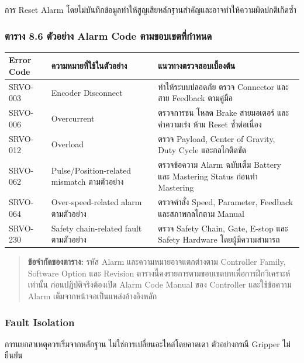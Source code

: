 การ Reset Alarm โดยไม่บันทึกข้อมูลทำให้สูญเสียหลักฐานสำคัญและอาจทำให้ความผิดปกติเกิดซ้ำ

\subsubsection{ตาราง 8.6 ตัวอย่าง Alarm Code ตามขอบเขตที่กำหนด}

\begin{table}[htbp]
    \centering
    \small
    \begin{tabularx}{\textwidth}{@{}L{0.16\textwidth}L{0.28\textwidth}Y@{}}
        \hline
        \textbf{Error Code} & \textbf{ความหมายที่ใช้ในตัวอย่าง} & \textbf{แนวทางตรวจสอบเบื้องต้น} \\
        \hline
        SRVO-003 & Encoder Disconnect & ทำให้ระบบปลอดภัย ตรวจ Connector และสาย Feedback ตามคู่มือ \\
        SRVO-006 & Overcurrent & ตรวจการชน โหลด Brake สายมอเตอร์ และค่าความเร่ง ห้าม Reset ซ้ำต่อเนื่อง \\
        SRVO-012 & Overload & ตรวจ Payload, Center of Gravity, Duty Cycle และกลไกติดขัด \\
        SRVO-062 & Pulse/Position-related mismatch ตามตัวอย่าง & ตรวจข้อความ Alarm ฉบับเต็ม Battery และ Mastering Status ก่อนทำ Mastering \\
        SRVO-064 & Over-speed-related alarm ตามตัวอย่าง & ตรวจคำสั่ง Speed, Parameter, Feedback และสภาพกลไกตาม Manual \\
        SRVO-230 & Safety chain-related fault ตามตัวอย่าง & ตรวจ Safety Chain, Gate, E-stop และ Safety Hardware โดยผู้มีความสามารถ \\
        \hline
    \end{tabularx}
\end{table}

\begin{quote}
\textbf{ข้อจำกัดของตาราง:} รหัส Alarm และความหมายอาจแตกต่างตาม Controller Family, Software Option และ Revision ตารางนี้คงรายการตามขอบเขตบทเพื่อการฝึกวิเคราะห์เท่านั้น ก่อนปฏิบัติจริงต้องเปิด Alarm Code Manual ของ Controller และใช้ข้อความ Alarm เต็มจากหน้าจอเป็นแหล่งอ้างอิงหลัก
\end{quote}

\subsubsection{Fault Isolation}

การแยกสาเหตุควรเริ่มจากหลักฐาน ไม่ใช่การเปลี่ยนอะไหล่โดยคาดเดา ตัวอย่างกรณี Gripper ไม่ยืนยัน

